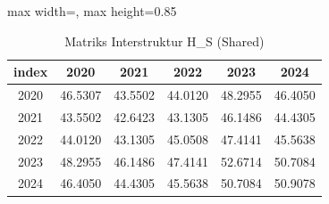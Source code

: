 \begin{table}[H]
\centering
\caption{Matriks Interstruktur H\_S (Shared)} \makeatletter{}\makeatother
\begin{adjustbox}{max width=\textwidth, max height=0.85\textheight}
\begin{tabular}{|c|c|c|c|c|c|}
\hline
\textbf{index} & \textbf{2020} & \textbf{2021} & \textbf{2022} & \textbf{2023} & \textbf{2024} \\
\hline
2020 & 46.5307 & 43.5502 & 44.0120 & 48.2955 & 46.4050 \\
2021 & 43.5502 & 42.6423 & 43.1305 & 46.1486 & 44.4305 \\
2022 & 44.0120 & 43.1305 & 45.0508 & 47.4141 & 45.5638 \\
2023 & 48.2955 & 46.1486 & 47.4141 & 52.6714 & 50.7084 \\
2024 & 46.4050 & 44.4305 & 45.5638 & 50.7084 & 50.9078 \\
\hline
\end{tabular}
\end{adjustbox}
\end{table}